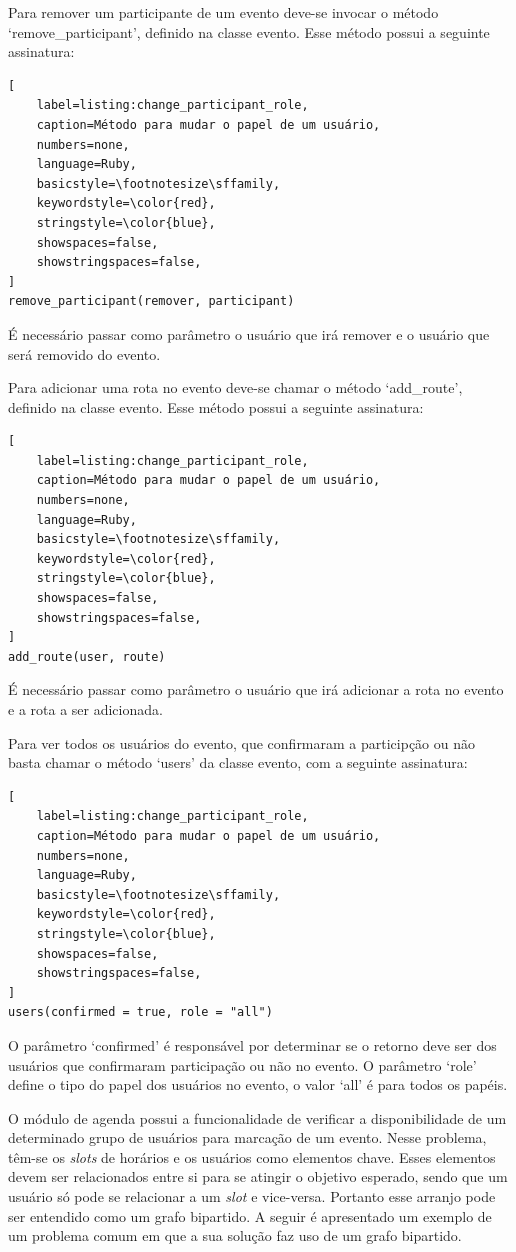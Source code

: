Para remover um participante de um evento deve-se invocar o método `remove\_participant', definido na classe evento. Esse método possui a seguinte assinatura:

\begin{lstlisting}[
    label=listing:change_participant_role,
    caption=Método para mudar o papel de um usuário,
    numbers=none,
    language=Ruby,
    basicstyle=\footnotesize\sffamily,
    keywordstyle=\color{red},
    stringstyle=\color{blue},
    showspaces=false,
    showstringspaces=false,
]
remove_participant(remover, participant)
\end{lstlisting}

É necessário passar como parâmetro o usuário que irá remover e o usuário que será removido do evento.

Para adicionar uma rota no evento deve-se chamar o método `add\_route', definido na classe evento. Esse método possui a seguinte assinatura:

\begin{lstlisting}[
    label=listing:change_participant_role,
    caption=Método para mudar o papel de um usuário,
    numbers=none,
    language=Ruby,
    basicstyle=\footnotesize\sffamily,
    keywordstyle=\color{red},
    stringstyle=\color{blue},
    showspaces=false,
    showstringspaces=false,
]
add_route(user, route)
\end{lstlisting}

É necessário passar como parâmetro o usuário que irá adicionar a rota no evento e a rota a ser adicionada.

Para ver todos os usuários do evento, que confirmaram a participção ou não basta chamar o método `users' da classe evento, com a seguinte assinatura:

\begin{lstlisting}[
    label=listing:change_participant_role,
    caption=Método para mudar o papel de um usuário,
    numbers=none,
    language=Ruby,
    basicstyle=\footnotesize\sffamily,
    keywordstyle=\color{red},
    stringstyle=\color{blue},
    showspaces=false,
    showstringspaces=false,
]
users(confirmed = true, role = "all")
\end{lstlisting}

O parâmetro `confirmed' é responsável por determinar se o retorno deve ser dos usuários que confirmaram participação ou não no evento. O parâmetro `role' define o tipo do papel dos usuários no evento, o valor `all' é para todos os papéis.

O módulo de agenda possui a funcionalidade de verificar a disponibilidade de um determinado grupo de usuários para marcação de um evento. Nesse problema, têm-se os \textit{slots} de horários e os usuários como elementos chave. Esses elementos devem ser relacionados entre si para se atingir o objetivo esperado, sendo que um usuário só pode se relacionar a um \textit{slot} e vice-versa. Portanto esse arranjo pode ser entendido como um grafo bipartido. A seguir é apresentado um exemplo de um problema comum em que a sua solução faz uso de um grafo bipartido.

